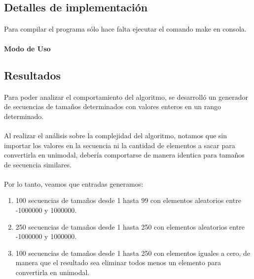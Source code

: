 \subsection{Detalles de implementación}

\paragraph{}
Para compilar el programa sólo hace falta ejecutar el comando make en consola.

\paragraph{Modo de Uso}


\pagebreak[4]
\clearpage

\subsection{Resultados}
\label{resultadosej1}

\paragraph{}
Para poder analizar el comportamiento del algoritmo, se desarrolló un generador de secuencias de tamaños determinados con valores enteros en un rango determinado.

\paragraph{}
Al realizar el análisis sobre la complejidad del algoritmo, notamos que sin importar los valores en la secuencia ni la cantidad de elementos a sacar para convertirla en unimodal, debería comportarse de manera identica para tamaños de secuencia similares.

\paragraph{}
Por lo tanto, veamos que entradas generamos:
\begin{enumerate}
  \item 100 secuencias de tamaños desde 1 hasta 99 con elementos aleatorios entre -1000000 y 1000000.
  \item 250 secuencias de tamaños desde 1 hasta 250 con elementos aleatorios entre -1000000 y 1000000.
  \item 100 secuencias de tamaños desde 1 hasta 250 con elementos iguales a cero, de manera que el resultado sea eliminar todos menos un elemento para convertirla en unimodal.
\end{enumerate}



